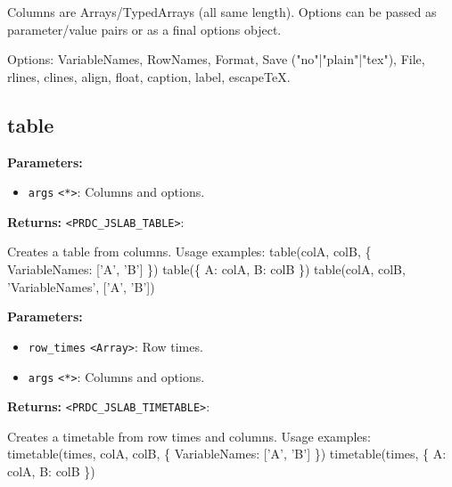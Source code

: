 \documentclass[12pt,a4paper]{article}
\begin{document}
Columns are Arrays/TypedArrays (all same length). Options can be passed as parameter/value
pairs or as a final options object.

Options: VariableNames, RowNames, Format, Save ("no"|"plain"|"tex"), File, rlines, clines,
align, float, caption, label, escapeTeX.


\subsection{table}
\vspace{5mm}
\noindent {}


\noindent \textbf{Parameters:}
\begin{itemize}
  \item \texttt{args} \texttt{<*>}: Columns and options.
\end{itemize}

\noindent \textbf{Returns:} \texttt{<PRDC\_JSLAB\_TABLE>}:

\noindent Creates a table from columns.
Usage examples:
table(colA, colB, \{ VariableNames: ['A', 'B'] \})
table(\{ A: colA, B: colB \})
table(colA, colB, 'VariableNames', ['A', 'B'])

\vspace{5mm}
\noindent {}


\noindent \textbf{Parameters:}
\begin{itemize}
  \item \texttt{row\_times} \texttt{<Array>}: Row times.
  \item \texttt{args} \texttt{<*>}: Columns and options.
\end{itemize}

\noindent \textbf{Returns:} \texttt{<PRDC\_JSLAB\_TIMETABLE>}:

\noindent Creates a timetable from row times and columns.
Usage examples:
timetable(times, colA, colB, \{ VariableNames: ['A', 'B'] \})
timetable(times, \{ A: colA, B: colB \})

\vspace{5mm}
\noindent {}
\end{document}
